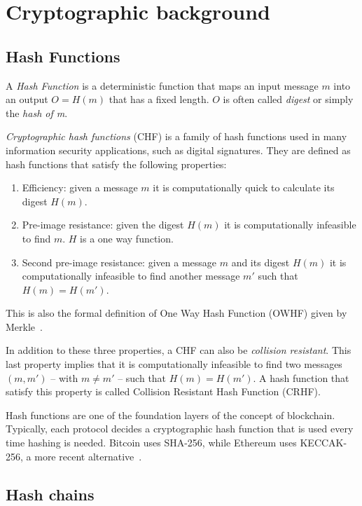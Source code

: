 \label{chapter-2}

\section{Cryptographic background}

\subsection{Hash Functions}

A \textit{Hash Function} is a deterministic function that maps an input message $m$ into an output $O=H(m)$ that has a fixed length. $O$ is often called \textit{digest} or simply the \textit{hash of m}.\

\textit{Cryptographic hash functions} (CHF) is a family of hash functions used in many information security applications, such as digital signatures. They are defined as hash functions that satisfy the following properties:

\begin{enumerate}
    \item Efficiency: given a message $m$ it is computationally quick to calculate its digest $H(m)$.
    \item Pre-image resistance: given the digest $H(m)$ it is computationally infeasible to find $m$. $H$ is a one way function.
    \item Second pre-image resistance: given a message $m$ and its digest $H(m)$ it is computationally infeasible to find another message $m'$ such that $H(m)=H(m')$.
\end{enumerate}

This is also the formal definition of One Way Hash Function (OWHF) given by Merkle~\cite{chf}. \

In addition to these three properties, a CHF can also be \textit{collision resistant}. This last property implies that it is computationally infeasible to find two messages $(m,m')$ -- with $m\neq m'$ -- such that $H(m)=H(m')$. A hash function that satisfy this property is called Collision Resistant Hash Function (CRHF).

Hash functions are one of the foundation layers of the concept of blockchain. Typically, each protocol decides a cryptographic hash function that is used every time hashing is needed. Bitcoin uses SHA-256, while Ethereum uses KECCAK-256, a more recent alternative~\cite{bitcoin,Ethereum}.

\subsection{Hash chains}

